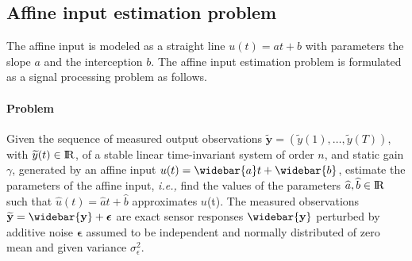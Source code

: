 \subsection{Affine input estimation problem}

The affine input is modeled as a straight line $u(t) = {a} t + {b}$ with parameters the slope $a$ and the interception $b$.
The affine input estimation problem is formulated as a signal processing problem as follows. 


\paragraph{Problem} 
Given the sequence of measured output observations $\widetilde{\mathbf{y}} = \left( \widetilde{y}(1),\ldots, \widetilde{y}(T)\right)$, with $\widetilde{y}(t) \in {\rm I\!R}$, of a stable linear time-invariant system of order $n$, and static gain $\gamma$, generated by an affine input $u(t) = \widebar{a} t + \widebar{b}$, estimate the parameters of the affine input, \textit{i.e.,} find the values of the parameters $\widehat{a}, \widehat{b} \in {\rm I\!R}$ such that $\widehat{u}(t) = \widehat{a} t + \widehat{b}$ approximates $u$(t).
The measured observations $\widetilde{\mathbf{y}} = \widebar{\mathbf{y}} + \bm{\epsilon}$ are exact sensor responses $\widebar{\mathbf{y}}$ perturbed by additive noise  $\bm{\epsilon}$ assumed to be independent and normally distributed of zero mean and given variance $\sigma_{\epsilon}^2$.

